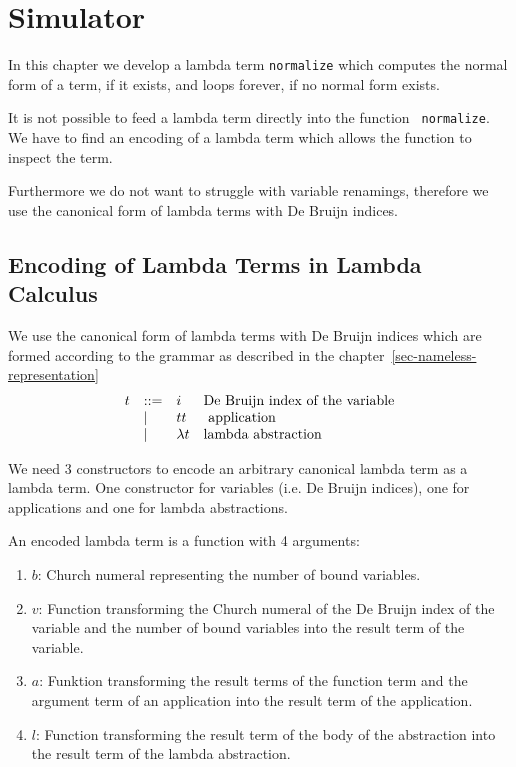 \documentclass[12pt]{article}
\begin{document}
\section{Simulator}
\label{sec-simulator}

In this chapter we develop a lambda term {\tt normalize} which computes the
normal form of a term, if it exists, and loops forever, if no normal form
exists.

It is not possible to feed a lambda term directly into the function {\tt
normalize}. We have to find an encoding of a lambda term which allows the
function to inspect the term.

Furthermore we do not want to struggle with variable renamings, therefore we use
the canonical form of lambda terms with De Bruijn indices.



\subsection{Encoding of Lambda Terms in Lambda Calculus}

We use the canonical form of lambda terms with De Bruijn indices which are
formed according to the grammar as described in the
chapter~\ref{sec-nameless-representation}
$$
\vertlist{
    t &::=&
    i 
    & \text{De Bruijn index of the variable}
    \\
    &\mid&
    t t &
     \text{application}
    \\
    &\mid&
    \lambda t
    &\text{lambda abstraction}
}
$$

We need 3 constructors to encode an arbitrary canonical lambda term as a lambda
term. One constructor for variables (i.e. De Bruijn indices), one for
applications and one for lambda abstractions.

An encoded lambda term is a function with 4 arguments:
\begin{enumerate}
    \item $b$: Church numeral representing the number of bound variables.

    \item $v$: Function transforming the Church numeral of the De Bruijn index
        of the variable and the number of bound variables into the result term
        of the variable.

    \item $a$: Funktion transforming the result terms of the function term and the
        argument term of an application into the result term of the application.

    \item $l$: Function transforming the result term of the body of the
        abstraction into the result term of the lambda abstraction.
\end{enumerate}
\end{document}
